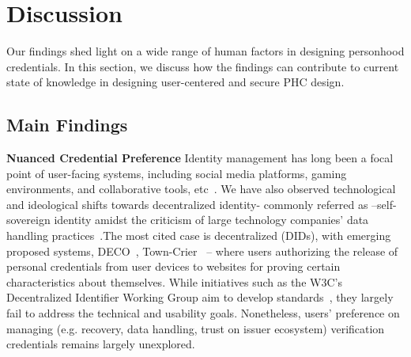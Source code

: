 \vspace{-6mm}
\section{Discussion}
\vspace{-2mm}
Our findings shed light on a wide range of human factors in designing personhood credentials.
In this section, we discuss how the findings can contribute to current state of knowledge in designing user-centered and secure PHC design. 
\vspace{-2mm}
\subsection{Main Findings}
\vspace{-2mm}

\textbf{Nuanced Credential Preference}
Identity management has long been a focal point of user-facing systems, including social media platforms, gaming environments, and collaborative tools, etc~\cite{gorwa2020unpacking, cetinkaya2007verification, sharma2024future, sharma2024unpacking}. We have also observed technological and ideological shifts towards 
decentralized identity- commonly referred as --self-sovereign identity amidst the criticism of large technology companies' data handling practices~\cite{nytimesCambridgeAnalytica}.The most cited case is decentralized (DIDs), with emerging proposed systems, DECO~\cite{zhang2020deco}, Town-Crier~\cite{zhang2016town} -- where users authorizing the release of personal credentials from user devices to websites for proving certain characteristics about themselves. 
While initiatives such as the W3C’s Decentralized Identifier Working Group aim to develop standards~\cite{identityDecentralizedIdentity, w3cccgDecentralizedIdentifiers}, they largely fail to address the technical and usability goals.
Nonetheless, users' preference on managing (e.g. recovery, data handling, trust on issuer ecosystem) verification credentials remains largely unexplored. 

